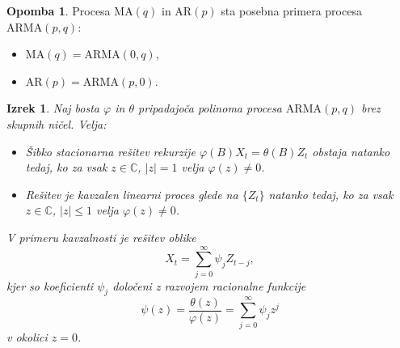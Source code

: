 \documentclass[11pt]{amsart}
\providecommand{\abs}[1]{\left\lvert #1 \right\rvert}
\theoremstyle{definition}
\newtheorem{opomba}[definicija]{Opomba}
\theoremstyle{plain}
\newtheorem{izrek}[definicija]{Izrek}
\begin{document}
\begin{opomba}
    Procesa $\mathrm{MA}(q)$ in $\mathrm{AR}(p)$ sta posebna primera procesa $\mathrm{ARMA}(p,q)$:
    \begin{itemize}
        \item $\mathrm{MA}(q) = \mathrm{ARMA}(0, q)$,
        \item $\mathrm{AR}(p) = \mathrm{ARMA}(p, 0)$.
    \end{itemize}
\end{opomba}

\begin{izrek}
    Naj bosta $\varphi$ in $\theta$ pripadajoča polinoma procesa $\mathrm{ARMA}(p,q)$ brez 
    skupnih ničel. Velja:
    \begin{itemize}
        \item Šibko stacionarna rešitev rekurzije $\varphi(B) X_t = \theta(B) Z_t$ obstaja 
              natanko tedaj, ko za vsak $z \in \mathbb{C}$, $\abs{z} = 1$ velja $\varphi(z) \neq 0$.
        \item Rešitev je kavzalen linearni proces glede na $\{Z_t\}$ natanko tedaj, ko za 
              vsak $z \in \mathbb{C}$, $\abs{z} \leq 1$ velja $\varphi(z) \neq 0$.
    \end{itemize}
    V primeru kavzalnosti je rešitev oblike
    \[
        X_t = \sum_{j=0}^{\infty} \psi_j Z_{t-j},
    \]
    kjer so koeficienti $\psi_j$ določeni z razvojem racionalne funkcije
    \[
        \psi(z) = \frac{\theta(z)}{\varphi(z)} = \sum_{j=0}^{\infty} \psi_j z^j
    \]
    v okolici $z = 0$.
\end{izrek}
\end{document}

